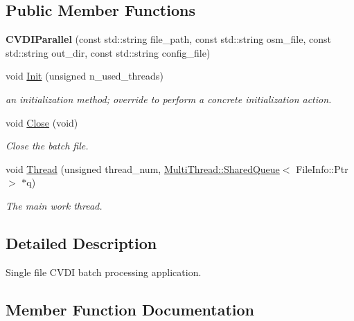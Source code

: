 \subsection*{Public Member Functions}
\begin{DoxyCompactItemize}
\item 
{\bfseries C\+V\+D\+I\+Parallel} (const std\+::string file\+\_\+path, const std\+::string osm\+\_\+file, const std\+::string out\+\_\+dir, const std\+::string config\+\_\+file)\hypertarget{classcvdi__multi_1_1CVDIParallel_a7548d213ef13ea2be4634c4d71ee8e49}{}\label{classcvdi__multi_1_1CVDIParallel_a7548d213ef13ea2be4634c4d71ee8e49}

\item 
void \hyperlink{classcvdi__multi_1_1CVDIParallel_a5d162d98140883424d43acd01c562507}{Init} (unsigned n\+\_\+used\+\_\+threads)
\begin{DoxyCompactList}\small\item\em an initialization method; override to perform a concrete initialization action. \end{DoxyCompactList}\item 
void \hyperlink{classcvdi__multi_1_1CVDIParallel_a621f66bf0446ed9a9a63e9fbfb465f1e}{Close} (void)\hypertarget{classcvdi__multi_1_1CVDIParallel_a621f66bf0446ed9a9a63e9fbfb465f1e}{}\label{classcvdi__multi_1_1CVDIParallel_a621f66bf0446ed9a9a63e9fbfb465f1e}

\begin{DoxyCompactList}\small\item\em Close the batch file. \end{DoxyCompactList}\item 
void \hyperlink{classcvdi__multi_1_1CVDIParallel_a7c256d91bb868873a1c6ce854c923c17}{Thread} (unsigned thread\+\_\+num, \hyperlink{classMultiThread_1_1SharedQueue}{Multi\+Thread\+::\+Shared\+Queue}$<$ File\+Info\+::\+Ptr $>$ $\ast$q)
\begin{DoxyCompactList}\small\item\em The main work thread. \end{DoxyCompactList}\end{DoxyCompactItemize}


\subsection{Detailed Description}
Single file C\+V\+DI batch processing application. 

\subsection{Member Function Documentation}
